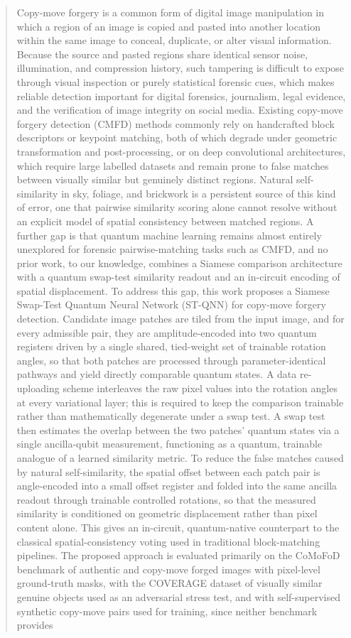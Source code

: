 \documentclass[conference]{IEEEtran}
\begin{document}
\begin{abstract}
Copy-move forgery is a common form of digital image manipulation in which a region of an image is copied and pasted into another location within the same image to conceal, duplicate, or alter visual information. Because the source and pasted regions share identical sensor noise, illumination, and compression history, such tampering is difficult to expose through visual inspection or purely statistical forensic cues, which makes reliable detection important for digital forensics, journalism, legal evidence, and the verification of image integrity on social media. Existing copy-move forgery detection (CMFD) methods commonly rely on handcrafted block descriptors or keypoint matching, both of which degrade under geometric transformation and post-processing, or on deep convolutional architectures, which require large labelled datasets and remain prone to false matches between visually similar but genuinely distinct regions. Natural self-similarity in sky, foliage, and brickwork is a persistent source of this kind of error, one that pairwise similarity scoring alone cannot resolve without an explicit model of spatial consistency between matched regions. A further gap is that quantum machine learning remains almost entirely unexplored for forensic pairwise-matching tasks such as CMFD, and no prior work, to our knowledge, combines a Siamese comparison architecture with a quantum swap-test similarity readout and an in-circuit encoding of spatial displacement. To address this gap, this work proposes a Siamese Swap-Test Quantum Neural Network (ST-QNN) for copy-move forgery detection. Candidate image patches are tiled from the input image, and for every admissible pair, they are amplitude-encoded into two quantum registers driven by a single shared, tied-weight set of trainable rotation angles, so that both patches are processed through parameter-identical pathways and yield directly comparable quantum states. A data re-uploading scheme interleaves the raw pixel values into the rotation angles at every variational layer; this is required to keep the comparison trainable rather than mathematically degenerate under a swap test. A swap test then estimates the overlap between the two patches' quantum states via a single ancilla-qubit measurement, functioning as a quantum, trainable analogue of a learned similarity metric. To reduce the false matches caused by natural self-similarity, the spatial offset between each patch pair is angle-encoded into a small offset register and folded into the same ancilla readout through trainable controlled rotations, so that the measured similarity is conditioned on geometric displacement rather than pixel content alone. This gives an in-circuit, quantum-native counterpart to the classical spatial-consistency voting used in traditional block-matching pipelines. The proposed approach is evaluated primarily on the CoMoFoD benchmark of authentic and copy-move forged images with pixel-level ground-truth masks, with the COVERAGE dataset of visually similar genuine objects used as an adversarial stress test, and with self-supervised synthetic copy-move pairs used for training, since neither benchmark provides 
\end{abstract}
\end{document}

